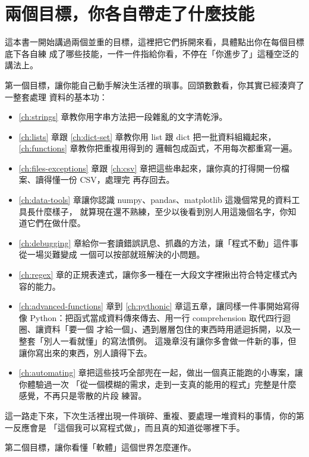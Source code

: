 \section{兩個目標，你各自帶走了什麼技能}
\label{sec:goals-recap}

這本書一開始講過兩個並重的目標，這裡把它們拆開來看，具體點出你在每個目標底下各自練
成了哪些技能，一件一件指給你看，不停在「你進步了」這種空泛的講法上。

第一個目標，讓你能自己動手解決生活裡的瑣事。回頭數數看，你其實已經湊齊了一整套處理
資料的基本功：

\begin{itemize}
    \item \ref{ch:strings} 章教你用字串方法把一段雜亂的文字清乾淨。
    \item \ref{ch:lists} 章跟 \ref{ch:dict-set} 章教你用 list 跟 dict 把一批資料組織起來，\ref{ch:functions} 章教你把重複用得到的
    邏輯包成函式，不用每次都重寫一遍。
    \item \ref{ch:files-exceptions} 章跟 \ref{ch:csv} 章把這些串起來，讓你真的打得開一份檔案、讀得懂一份 CSV，處理完
    再存回去。
    \item \ref{ch:data-tools} 章讓你認識 numpy、pandas、matplotlib 這幾個常見的資料工具長什麼樣子，
    就算現在還不熟練，至少以後看到別人用這幾個名字，你知道它們在做什麼。
    \item \ref{ch:debugging} 章給你一套讀錯誤訊息、抓蟲的方法，讓「程式不動」這件事從一場災難變成
    一個可以按部就班解決的小問題。
    \item \ref{ch:regex} 章的正規表達式，讓你多一種在一大段文字裡揪出符合特定樣式內容的能力。
    \item \ref{ch:advanced-functions} 章到 \ref{ch:pythonic} 章這五章，讓同樣一件事開始寫得
    像 Python：把函式當成資料傳來傳去、用一行 comprehension 取代四行迴圈、讓資料「要一個
    才給一個」、遇到層層包住的東西時用遞迴拆開，以及一整套「別人一看就懂」的寫法慣例。
    這幾章沒有讓你多會做一件新的事，但讓你寫出來的東西，別人讀得下去。
    \item \ref{ch:automating} 章把這些技巧全部兜在一起，做出一個真正能跑的小專案，讓你體驗過一次
    「從一個模糊的需求，走到一支真的能用的程式」完整是什麼感覺，不再只是零散的片段
    練習。
\end{itemize}

這一路走下來，下次生活裡出現一件瑣碎、重複、要處理一堆資料的事情，你的第一反應會是
「這個我可以寫程式做」，而且真的知道從哪裡下手。

第二個目標，讓你看懂「軟體」這個世界怎麼運作。

